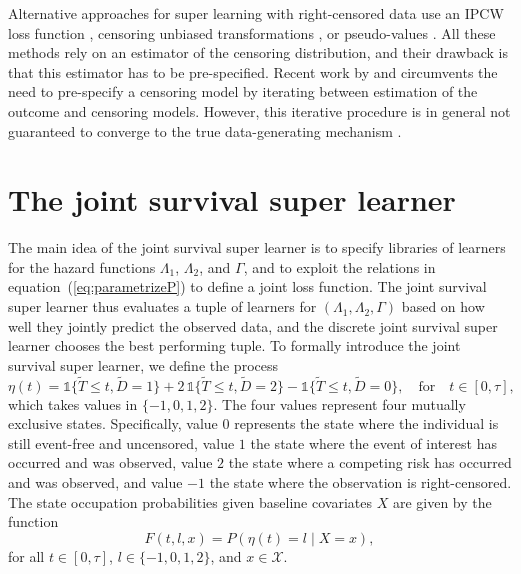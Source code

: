 \documentclass[alpha-refs]{wiley-article}
\newcommand{\1}{\mathbb{1}}
\begin{document}
Alternative approaches for super learning with right-censored data use
an IPCW loss function
\citep{graf1999assessment,van2003unicv,molinaro2004tree,keles2004asymptotically,hothorn2006survival,gerds2006consistent,gonzalez2021stacked},
censoring unbiased transformations
\citep{fan1996local,steingrimsson2019censoring}, or pseudo-values
\citep{andersen2003generalised,mogensen2013random,sachs2019ensemble}.
All these methods rely on an estimator of the censoring distribution,
and their drawback is that this estimator has to be pre-specified.
Recent work by \cite{han2021inverse} and \cite{westling2021inference}
circumvents the need to pre-specify a censoring model by iterating
between estimation of the outcome and censoring models. However, this
iterative procedure is in general not guaranteed to converge to the
true data-generating mechanism
\citep[][Appendix~A.4]{munch2024thesis}.


\section{The joint survival super learner}
\label{sec:joint-survival-super-learner}

The main idea of the joint survival super learner is to specify
libraries of learners for the hazard functions \( \Lambda_1 \), \(
\Lambda_2 \), and \( \Gamma \), and to exploit the relations in
equation~(\ref{eq:parametrizeP}) to define a joint loss function. The
joint survival super learner thus evaluates a tuple of learners for \(
(\Lambda_1, \Lambda_2, \Gamma) \) based on how well they jointly
predict the observed data, and the discrete joint survival super
learner chooses the best performing tuple. To formally introduce the
joint survival super learner, we define the process
\begin{equation*}
  \eta(t) = \1\{\tilde{T} \leq t, \tilde D=1\} + 2\,\1\{\tilde{T} \leq t, \tilde
  D=2\} - \1\{\tilde{T} \leq t, \tilde D=0\},
  \quad \text{for} \quad t \in [0, \tau],
\end{equation*}
which takes values in \( \{-1,0,1,2\}\). The four values represent
four mutually exclusive states. Specifically, value \( 0 \) represents
the state where the individual is still event-free and uncensored,
value \( 1\) the state where the event of interest has occurred and
was observed, value \( 2\) the state where a competing risk has
occurred and was observed, and value \( -1\) the state where the
observation is right-censored. The state occupation probabilities
given baseline covariates \( X \) are given by the function
\begin{equation}
  \label{eq:F-def}
  F(t, l, x) = P(\eta(t) = l \mid X=x),
\end{equation}
for all \( t \in [0,\tau] \), \( l \in \{-1,0,1,2\} \), and
\( x \in \mathcal{X} \).
\end{document}

